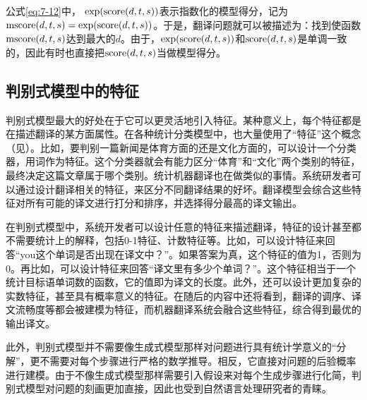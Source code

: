 \parinterval 公式\eqref{eq:7-12}中，$\ \textrm{exp}(\textrm{score}(d,\seq{t},\seq{s}))$表示指数化的模型得分，记为$\textrm{mscore}(d,{t},{s}) = \textrm{exp}(\textrm{score}(d,{t},{s}))$。于是，翻译问题就可以被描述为：找到使函数$\textrm{mscore}(d,{t},{s})$达到最大的$d$。由于，$\textrm{exp}(\textrm{score}(d,{t},{s}))$和$\textrm{score}(d,{t},{s})$是单调一致的，因此有时也直接把$\textrm{score}(d,{t},{s})$当做模型得分。


\subsection{判别式模型中的特征}


\parinterval 判别式模型最大的好处在于它可以更灵活地引入特征。某种意义上，每个特征都是在描述翻译的某方面属性。在各种统计分类模型中，也大量使用了“特征”这个概念（见{\chapterthree}）。比如，要判别一篇新闻是体育方面的还是文化方面的，可以设计一个分类器，用词作为特征。这个分类器就会有能力区分“体育”和“文化”两个类别的特征，最终决定这篇文章属于哪个类别。统计机器翻译也在做类似的事情。系统研发者可以通过设计翻译相关的特征，来区分不同翻译结果的好坏。翻译模型会综合这些特征对所有可能的译文进行打分和排序，并选择得分最高的译文输出。

\parinterval 在判别式模型中，系统开发者可以设计任意的特征来描述翻译，特征的设计甚至都不需要统计上的解释，包括0-1特征、计数特征等。比如，可以设计特征来回答“you这个单词是否出现在译文中？”。如果答案为真，这个特征的值为1，否则为0。再比如，可以设计特征来回答“译文里有多少个单词？”。这个特征相当于一个统计目标语单词数的函数，它的值即为译文的长度。此外，还可以设计更加复杂的实数特征，甚至具有概率意义的特征。在随后的内容中还将看到，翻译的调序、译文流畅度等都会被建模为特征，而机器翻译系统会融合这些特征，综合得到最优的输出译文。

\parinterval 此外，判别式模型并不需要像生成式模型那样对问题进行具有统计学意义的“分解”，更不需要对每个步骤进行严格的数学推导。相反，它直接对问题的后验概率进行建模。由于不像生成式模型那样需要引入假设来对每个生成步骤进行化简，判别式模型对问题的刻画更加直接，因此也受到自然语言处理研究者的青睐。


